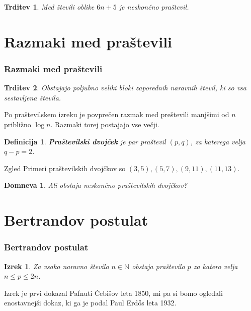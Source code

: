 \documentclass{beamer}
\newtheorem{definicija}{Definicija}
\newtheorem{izrek}{Izrek}
\newtheorem{trditev}{Trditev}
\newtheorem{domneva}{Domneva}
\def\N{\mathbb{N}}
\begin{document}

\begin{frame}
    \begin{trditev}
        Med števili oblike $6n + 5$ je neskončno praštevil.
    \end{trditev}
\end{frame}


\section{Razmaki med praštevili}
\begin{frame}
    \frametitle{Razmaki med praštevili}
    \begin{trditev}
        Obstajajo poljubno veliki bloki zaporednih naravnih števil, ki so vsa sestavljena števila.
    \end{trditev}
    \medskip
    Po praštevilskem izreku je povprečen razmak med preštevili manjšimi od $n$ približno $\log{n}$. Razmaki torej postajajo vse večji.
\end{frame}


\begin{frame}
    \begin{definicija}
        \textbf{Praštevilski dvojček} je par praštevil $(p, q)$, za katerega velja $q - p = 2$.
    \end{definicija}
    \pause
    \medskip
    \begin{exampleblock}{Zgled}
        Primeri praštevilskih dvojčkov so $(3, 5), (5, 7), (9, 11), (11, 13)$.
    \end{exampleblock}
    \pause
    \medskip
    \begin{domneva}
        Ali obstaja neskončno praštevilskih dvojčkov?
    \end{domneva}   
\end{frame}


\section{Bertrandov postulat}
\begin{frame}
    \frametitle{Bertrandov postulat}
    \begin{izrek}
        Za vsako naravno število $n \in \N$ obstaja praštevilo $p$ za katero velja $n \leq p \leq 2n$.
    \end{izrek}
    \medskip
    Izrek je prvi dokazal Pafnuti Čebišov leta 1850, mi pa si bomo ogledali enostavnejši dokaz, ki ga je podal Paul Erd\H{o}s leta 1932.
\end{frame}
\end{document}
